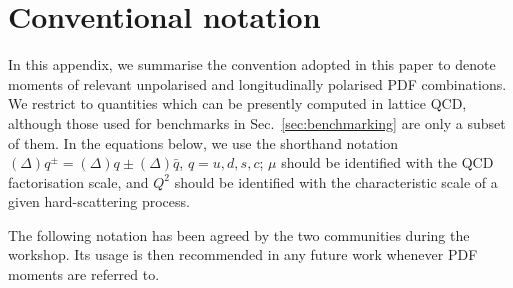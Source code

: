 \section{Conventional notation}
\label{app:notation}

In this appendix, we summarise the convention adopted in this paper to denote 
moments of relevant unpolarised and longitudinally polarised PDF combinations.
%
We restrict to quantities which can be presently computed in lattice QCD,
although those used for benchmarks in Sec.~\ref{sec:benchmarking} are only
a subset of them.
%
In the equations below, we use the shorthand notation 
$(\Delta)q^\pm=(\Delta)q\pm(\Delta)\bar{q}$, $q=u,d,s,c$;
$\mu$ should be identified with the QCD factorisation scale,
and $Q^2$ should be identified with the characteristic scale of a given 
hard-scattering process.

The following notation has been agreed by the two communities during the 
workshop.
%
Its usage is then recommended in any future work whenever PDF moments are 
referred to.

